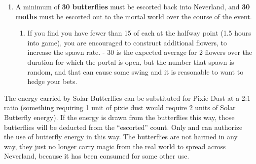 \documentclass[green]{PP}
\begin{document}
\begin{enumerate}
\begin{enumerate}
	\end{enumerate}
	\item A minimum of \textbf{30 butterflies} must be escorted back into Neverland, and \textbf{30 moths} must be escorted out to the mortal world over the course of the event.
		\begin{enumerate}
		\item If you find you have fewer than 15 of each at the halfway point (1.5 hours into game), you are encouraged to construct additional flowers, to increase the spawn rate. - 30 is the expected average for 2 flowers over the duration for which the portal is open, but the number that spawn is random, and that can cause some swing and it is reasonable to want to hedge your bets.
	\end{enumerate}
\end{enumerate}

The energy carried by Solar Butterflies can be substituted for Pixie Dust at a 2:1 ratio (something requiring 1 unit of pixie dust would require 2 units of Solar Butterfly energy). If the energy is drawn from the butterflies this way, those butterflies will be deducted from the “escorted” count. Only \cFButterfly{} and \cFHead{} can authorize the use of butterfly energy in this way. The butterflies are not harmed in any way, they just no longer carry magic from the real world to spread across Neverland, because it has been consumed for some other use.
\end{document}
